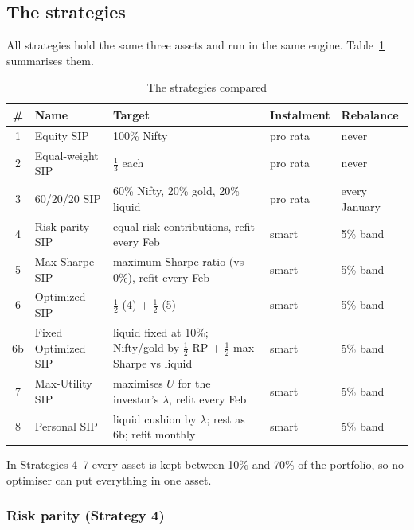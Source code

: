 \subsection{The strategies}

All strategies hold the same three assets and run in the same engine. Table~\ref{tab:strategies}
summarises them.

\begin{table}[H]
\centering
\caption{The strategies compared}
\label{tab:strategies}
\small
\begin{tabularx}{\textwidth}{@{}clXll@{}}
\toprule
\# & Name & Target & Instalment & Rebalance \\
\midrule
1 & Equity SIP & 100\% Nifty & pro rata & never \\
2 & Equal-weight SIP & $\tfrac13$ each & pro rata & never \\
3 & 60/20/20 SIP & 60\% Nifty, 20\% gold, 20\% liquid & pro rata & every January \\
4 & Risk-parity SIP & equal risk contributions, refit every Feb & smart & 5\% band \\
5 & Max-Sharpe SIP & maximum Sharpe ratio (vs 0\%), refit every Feb & smart & 5\% band \\
6 & Optimized SIP & $\tfrac12$ (4) + $\tfrac12$ (5) & smart & 5\% band \\
6b & Fixed Optimized SIP & liquid fixed at 10\%; Nifty/gold by $\tfrac12$ RP + $\tfrac12$ max Sharpe vs liquid & smart & 5\% band \\
7 & Max-Utility SIP & maximises $U$ for the investor's $\lambda$, refit every Feb & smart & 5\% band \\
8 & Personal SIP & liquid cushion by $\lambda$; rest as 6b; refit monthly & smart & 5\% band \\
\bottomrule
\end{tabularx}
\end{table}

In Strategies 4--7 every asset is kept between 10\% and 70\% of the portfolio, so no optimiser can
put everything in one asset.

\subsubsection{Risk parity (Strategy 4)}
\label{sec:rp}

